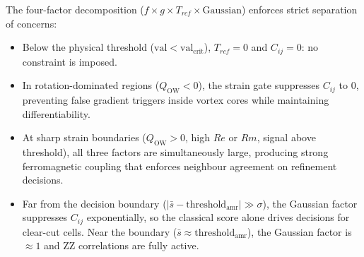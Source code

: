 \documentclass[12pt, a4paper, oneside]{report}
\begin{document}
The four-factor decomposition ($f \times g \times T_{rcf} \times \text{Gaussian}$) enforces strict separation of concerns:
\begin{itemize}
    \item Below the physical threshold ($\text{val} < \text{val}_{\text{crit}}$), $T_{rcf} = 0$ and $C_{ij} = 0$: no constraint is imposed.
    \item In rotation-dominated regions ($Q_{\text{OW}} < 0$), the strain gate suppresses $C_{ij}$ to $0$, preventing false gradient triggers inside vortex cores while maintaining differentiability.
    \item At sharp strain boundaries ($Q_{\text{OW}} > 0$, high $Re$ or $Rm$, signal above threshold), all three factors are simultaneously large, producing strong ferromagnetic coupling that enforces neighbour agreement on refinement decisions.
    \item Far from the decision boundary ($|\bar{s} - \text{threshold}_{\text{amr}}| \gg \sigma$), the Gaussian factor suppresses $C_{ij}$ exponentially, so the classical score alone drives decisions for clear-cut cells. Near the boundary ($\bar{s} \approx \text{threshold}_{\text{amr}}$), the Gaussian factor is $\approx 1$ and ZZ correlations are fully active.
\end{itemize}
\end{document}
